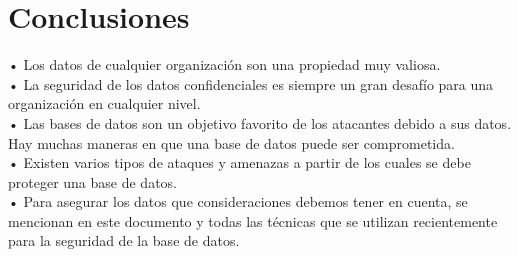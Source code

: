 \section{Conclusiones}
• Los datos de cualquier organización son una propiedad muy valiosa.\\
• La seguridad de los datos confidenciales es siempre un gran desafío para una organización en cualquier nivel. \\
• Las bases de datos son un objetivo favorito de los atacantes debido a sus datos. Hay muchas maneras en que una base de datos puede ser comprometida. \\
• Existen varios tipos de ataques y amenazas a partir de los cuales se debe proteger una base de datos. \\
• Para asegurar los datos que consideraciones debemos tener en cuenta, se mencionan en este documento y todas las técnicas que se utilizan recientemente para la seguridad de la base de datos.